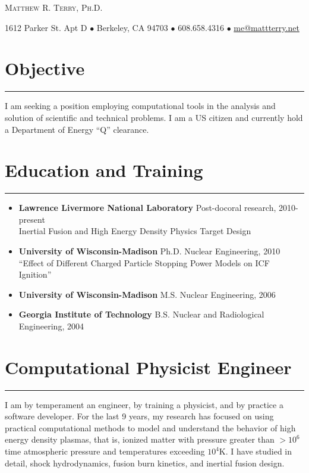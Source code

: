 \documentclass[letterpaper,11pt]{article}
\def\name{Matthew R. Terry, Ph.D.}
\newcommand{\sectionline}{\vspace{-0.05in}\hrule\vspace{0.05in}}
\begin{document}
\begin{center}
	{\huge\scshape \name}

	1612 Parker St. Apt D $\bullet$
	Berkeley, CA 94703 $\bullet$
	608.658.4316 $\bullet$
	\href{mailto:me@mattterry.net}{me@mattterry.net}
\end{center}

\section*{Objective}
\sectionline
I am seeking a position employing computational tools in the analysis and
solution of scientific and technical problems.  I am a US citizen and currently
hold a Department of Energy ``Q'' clearance.

\section*{Education and Training}
\sectionline
\begin{itemize}
	\item
		\textbf{Lawrence Livermore National Laboratory} Post-docoral research, 2010-present \\
		Inertial Fusion and High Energy Density Physics Target Design
	\item 
		\textbf{University of Wisconsin-Madison} Ph.D. Nuclear Engineering, 2010 \\
		``Effect of Different Charged Particle Stopping Power Models on ICF Ignition''
	\item 
		\textbf{University of Wisconsin-Madison} M.S. Nuclear Engineering, 2006
	\item 
		\textbf{Georgia Institute of Technology} B.S. Nuclear and Radiological Engineering, 2004
\end{itemize}



\section*{Computational Physicist Engineer}
\sectionline
I am by temperament an engineer, by training a physicist, and by practice a
software developer.  For the last 9 years, my research has focused on using
practical
computational methods to model and understand the behavior of high energy
density plasmas, that is, ionized matter with pressure greater than $>10^6$ time atmospheric
pressure and temperatures exceeding $10^4$K.  I have studied in detail, shock hydrodynamics,
fusion burn kinetics, and inertial fusion design.
\end{document}
